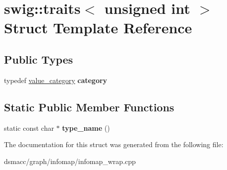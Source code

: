 \hypertarget{structswig_1_1traits_3_01unsigned_01int_01_4}{}\section{swig\+:\+:traits$<$ unsigned int $>$ Struct Template Reference}
\label{structswig_1_1traits_3_01unsigned_01int_01_4}
\subsection*{Public Types}
\begin{DoxyCompactItemize}
\item 
\mbox{\label{structswig_1_1traits_3_01unsigned_01int_01_4_adbf8449ea6a05ab607b5e8322725fa64}} 
typedef \mbox{\hyperlink{structswig_1_1value__category}{value\+\_\+category}} {\bfseries category}
\end{DoxyCompactItemize}
\subsection*{Static Public Member Functions}
\begin{DoxyCompactItemize}
\item 
\mbox{\label{structswig_1_1traits_3_01unsigned_01int_01_4_ae122f101d5fb6e502d0c6671d55bfcaa}} 
static const char $\ast$ {\bfseries type\+\_\+name} ()
\end{DoxyCompactItemize}


The documentation for this struct was generated from the following file\+:\begin{DoxyCompactItemize}
\item 
dsmacc/graph/infomap/infomap\+\_\+wrap.\+cpp\end{DoxyCompactItemize}
